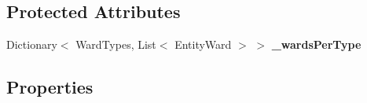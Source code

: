 \subsection*{Protected Attributes}
\begin{DoxyCompactItemize}
\item 
Dictionary$<$ Ward\+Types, List$<$ Entity\+Ward $>$ $>$ {\bfseries \+\_\+wards\+Per\+Type}\hypertarget{class_general_health_elements_1_1_inpatient_1_1_control_units_1_1_control_unit_inpatient_detailed_a642e656e4dc08421d1cc7e8122055ea2}{}\label{class_general_health_elements_1_1_inpatient_1_1_control_units_1_1_control_unit_inpatient_detailed_a642e656e4dc08421d1cc7e8122055ea2}

\end{DoxyCompactItemize}
\subsection*{Properties}

